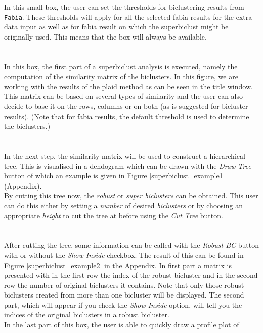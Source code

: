 \documentclass[a4paper]{article}\usepackage[]{graphicx}\usepackage[]{color}
\begin{document}
\noindent In this small box, the user can set the thresholds for biclustering
results from \verb|Fabia|. These thresholds will apply for all the selected
fabia results for the extra data input as well as for fabia result on which the
superbiclust might be originally used. This means that the box will always be
available.
\\ \\
\\
In this box, the first part of a superbiclust analysis is executed, namely the
computation of the similarity matrix of the biclusters. In this figure, we are
working with the results of the plaid method as can be seen in the title window.
This matrix can be based on several types of similarity and the user can
also decide to base it on the rows, columns or on both (as is suggested for bicluster
results). (Note that for fabia results, the default threshold is used to determine the biclusters.)
\\ \\
\\
In the next step, the similarity matrix will be used to construct a hierarchical
tree. This is visualised in a dendogram which can be drawn with the {\it Draw
Tree} button of which an example is given in Figure \ref{superbiclust_example1} 
(Appendix).\\
By cutting this tree now, the {\it robust} or {\it super biclusters} can be
obtained. This user can do this either by setting a {\it number} of desired
{\it biclusters} or by choosing an appropriate {\it height} to cut the tree at
before using the {\it Cut Tree} button.
\\ \\
\\
After cutting the tree, some information can be called with the {\it Robust BC} 
button with or without the {\it Show Inside} checkbox. The result of this can be
found in Figure \ref{superbiclust_example2} in the Appendix. In first part a
matrix is presented with in the first row the index of the robust bicluster and
in the second row the number of original biclusters it contains. Note that only
those robust biclusters created from more than one bicluster will be displayed.
The second part, which will appear if you check the {\it Show Inside} option,
will tell you the indices of the original biclusters in a robust bicluster.\\
In the last part of this box, the user is able to quickly draw a profile plot of
\end{document}

